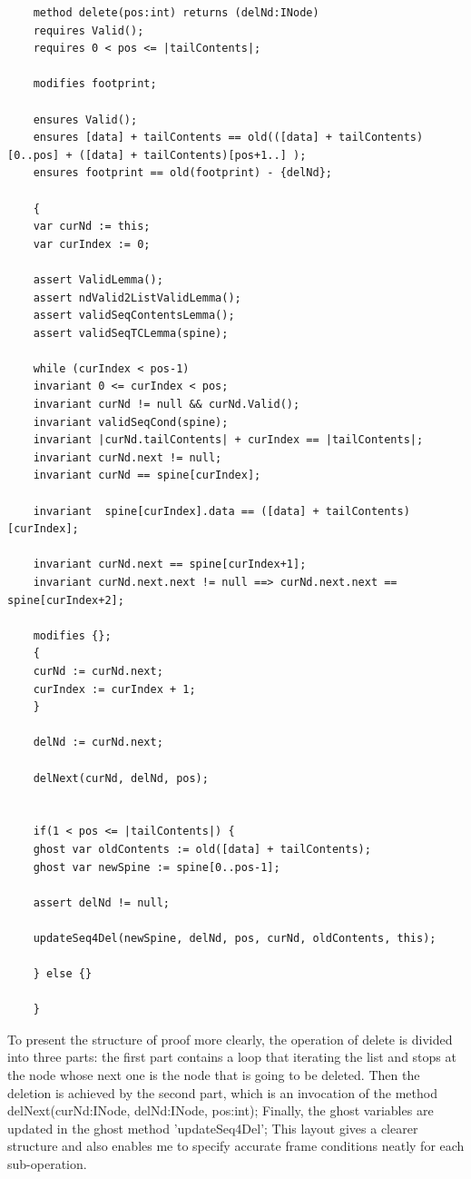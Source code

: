 \begin{lstlisting}
	method delete(pos:int) returns (delNd:INode)
	requires Valid();
	requires 0 < pos <= |tailContents|;
	
	modifies footprint;
	
	ensures Valid();
	ensures [data] + tailContents == old(([data] + tailContents)[0..pos] + ([data] + tailContents)[pos+1..] );
	ensures footprint == old(footprint) - {delNd};
	
	{
	var curNd := this;
	var curIndex := 0;
	
	assert ValidLemma();
	assert ndValid2ListValidLemma();
	assert validSeqContentsLemma();
	assert validSeqTCLemma(spine);
	
	while (curIndex < pos-1)
	invariant 0 <= curIndex < pos;
	invariant curNd != null && curNd.Valid();
	invariant validSeqCond(spine);
	invariant |curNd.tailContents| + curIndex == |tailContents|;
	invariant curNd.next != null;
	invariant curNd == spine[curIndex];
	
	invariant  spine[curIndex].data == ([data] + tailContents)[curIndex];
	
	invariant curNd.next == spine[curIndex+1];
	invariant curNd.next.next != null ==> curNd.next.next == spine[curIndex+2];
	
	modifies {};
	{
	curNd := curNd.next;
	curIndex := curIndex + 1;
	}
	
	delNd := curNd.next;
	
	delNext(curNd, delNd, pos);
	
	
	if(1 < pos <= |tailContents|) {
	ghost var oldContents := old([data] + tailContents); 
	ghost var newSpine := spine[0..pos-1];
	
	assert delNd != null;
	
	updateSeq4Del(newSpine, delNd, pos, curNd, oldContents, this);
	
	} else {}
	
	}
\end{lstlisting}

To present the structure of proof more clearly, the operation of delete is divided into three parts: the first part contains a loop that iterating the list and stops at the node whose next one is the node that is going to be deleted. Then the deletion is achieved by the second part, which is an invocation of the method delNext(curNd:INode, delNd:INode, pos:int); Finally, the ghost variables are updated in the ghost method 'updateSeq4Del'; This layout gives a clearer structure and also enables me to specify accurate frame conditions neatly for each sub-operation.

